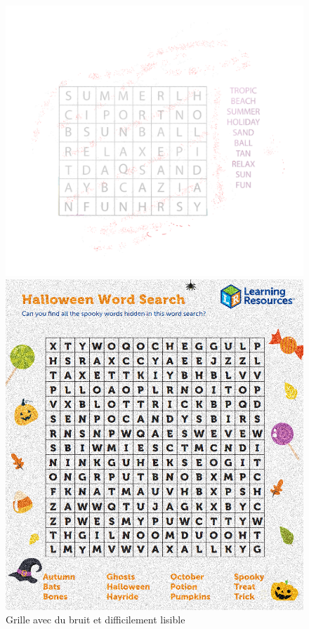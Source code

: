 \documentclass{article}
\begin{document}
\begin{figure}[!htb]
      \includegraphics[width=\linewidth]{ressources/image_1.png}
      \caption{Grille avec du bruit et difficilement lisible}
    \endminipage\hfill
      \includegraphics[width=\linewidth]{ressources/image_2.png}

\end{figure}
\end{document}
